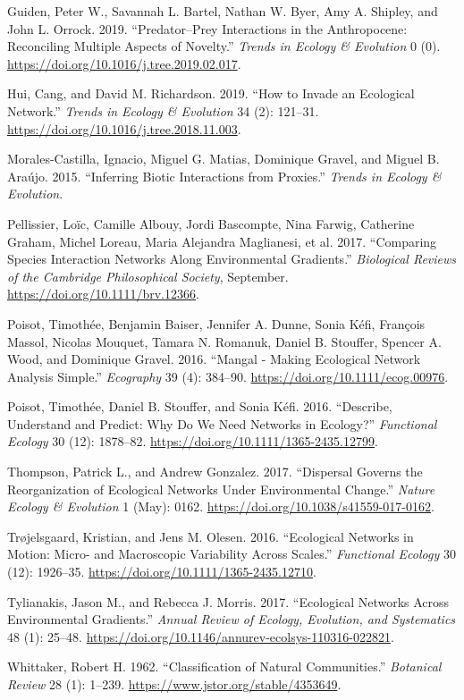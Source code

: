 \leavevmode\hypertarget{ref-GuidBart19}{}%
Guiden, Peter W., Savannah L. Bartel, Nathan W. Byer, Amy A. Shipley,
and John L. Orrock. 2019. ``Predator--Prey Interactions in the
Anthropocene: Reconciling Multiple Aspects of Novelty.'' \emph{Trends in
Ecology \& Evolution} 0 (0).
\url{https://doi.org/10.1016/j.tree.2019.02.017}.

\leavevmode\hypertarget{ref-HuiRich19}{}%
Hui, Cang, and David M. Richardson. 2019. ``How to Invade an Ecological
Network.'' \emph{Trends in Ecology \& Evolution} 34 (2): 121--31.
\url{https://doi.org/10.1016/j.tree.2018.11.003}.

\leavevmode\hypertarget{ref-MoraMati15}{}%
Morales-Castilla, Ignacio, Miguel G. Matias, Dominique Gravel, and
Miguel B. Araújo. 2015. ``Inferring Biotic Interactions from Proxies.''
\emph{Trends in Ecology \& Evolution}.

\leavevmode\hypertarget{ref-PellAlbo17}{}%
Pellissier, Loïc, Camille Albouy, Jordi Bascompte, Nina Farwig,
Catherine Graham, Michel Loreau, Maria Alejandra Maglianesi, et al.
2017. ``Comparing Species Interaction Networks Along Environmental
Gradients.'' \emph{Biological Reviews of the Cambridge Philosophical
Society}, September. \url{https://doi.org/10.1111/brv.12366}.

\leavevmode\hypertarget{ref-PoisBais16}{}%
Poisot, Timothée, Benjamin Baiser, Jennifer A. Dunne, Sonia Kéfi,
François Massol, Nicolas Mouquet, Tamara N. Romanuk, Daniel B. Stouffer,
Spencer A. Wood, and Dominique Gravel. 2016. ``Mangal - Making
Ecological Network Analysis Simple.'' \emph{Ecography} 39 (4): 384--90.
\url{https://doi.org/10.1111/ecog.00976}.

\leavevmode\hypertarget{ref-PoisStou16}{}%
Poisot, Timothée, Daniel B. Stouffer, and Sonia Kéfi. 2016. ``Describe,
Understand and Predict: Why Do We Need Networks in Ecology?''
\emph{Functional Ecology} 30 (12): 1878--82.
\url{https://doi.org/10.1111/1365-2435.12799}.

\leavevmode\hypertarget{ref-ThomGonz17}{}%
Thompson, Patrick L., and Andrew Gonzalez. 2017. ``Dispersal Governs the
Reorganization of Ecological Networks Under Environmental Change.''
\emph{Nature Ecology \& Evolution} 1 (May): 0162.
\url{https://doi.org/10.1038/s41559-017-0162}.

\leavevmode\hypertarget{ref-TrojOles16}{}%
Trøjelsgaard, Kristian, and Jens M. Olesen. 2016. ``Ecological Networks
in Motion: Micro- and Macroscopic Variability Across Scales.''
\emph{Functional Ecology} 30 (12): 1926--35.
\url{https://doi.org/10.1111/1365-2435.12710}.

\leavevmode\hypertarget{ref-TyliMorr17}{}%
Tylianakis, Jason M., and Rebecca J. Morris. 2017. ``Ecological Networks
Across Environmental Gradients.'' \emph{Annual Review of Ecology,
Evolution, and Systematics} 48 (1): 25--48.
\url{https://doi.org/10.1146/annurev-ecolsys-110316-022821}.

\leavevmode\hypertarget{ref-Whit62}{}%
Whittaker, Robert H. 1962. ``Classification of Natural Communities.''
\emph{Botanical Review} 28 (1): 1--239.
\url{https://www.jstor.org/stable/4353649}.

